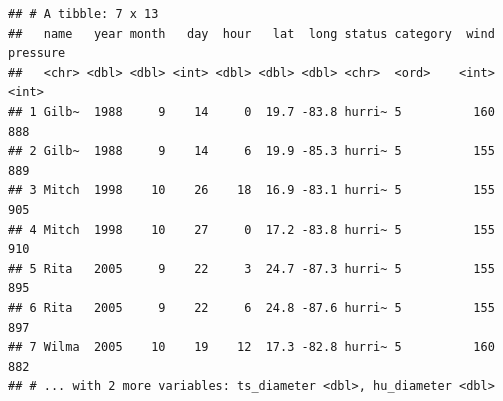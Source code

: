 \documentclass[]{article}
\newenvironment{Shaded}{\begin{snugshade}}{\end{snugshade}}
\newcommand{\CommentTok}[1]{\textcolor[rgb]{0.56,0.35,0.01}{\textit{#1}}}
\newcommand{\DataTypeTok}[1]{\textcolor[rgb]{0.13,0.29,0.53}{#1}}
\newcommand{\DecValTok}[1]{\textcolor[rgb]{0.00,0.00,0.81}{#1}}
\newcommand{\KeywordTok}[1]{\textcolor[rgb]{0.13,0.29,0.53}{\textbf{#1}}}
\newcommand{\NormalTok}[1]{#1}
\newcommand{\OperatorTok}[1]{\textcolor[rgb]{0.81,0.36,0.00}{\textbf{#1}}}
\newcommand{\OtherTok}[1]{\textcolor[rgb]{0.56,0.35,0.01}{#1}}
\newcommand{\StringTok}[1]{\textcolor[rgb]{0.31,0.60,0.02}{#1}}
\begin{document}
\begin{Shaded}
\end{Shaded}

\begin{verbatim}
## # A tibble: 7 x 13
##   name   year month   day  hour   lat  long status category  wind pressure
##   <chr> <dbl> <dbl> <int> <dbl> <dbl> <dbl> <chr>  <ord>    <int>    <int>
## 1 Gilb~  1988     9    14     0  19.7 -83.8 hurri~ 5          160      888
## 2 Gilb~  1988     9    14     6  19.9 -85.3 hurri~ 5          155      889
## 3 Mitch  1998    10    26    18  16.9 -83.1 hurri~ 5          155      905
## 4 Mitch  1998    10    27     0  17.2 -83.8 hurri~ 5          155      910
## 5 Rita   2005     9    22     3  24.7 -87.3 hurri~ 5          155      895
## 6 Rita   2005     9    22     6  24.8 -87.6 hurri~ 5          155      897
## 7 Wilma  2005    10    19    12  17.3 -82.8 hurri~ 5          160      882
## # ... with 2 more variables: ts_diameter <dbl>, hu_diameter <dbl>
\end{verbatim}

\begin{Shaded}
\end{Shaded}
\end{document}

